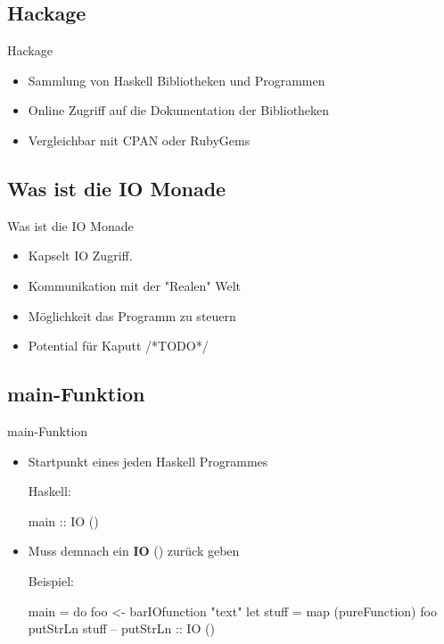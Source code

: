 \documentclass{beamer}
\begin{document}
\subsection{Hackage}
\begin{frame}{Hackage}
\begin{itemize}
\item Sammlung von Haskell Bibliotheken und Programmen
\item Online Zugriff auf die Dokumentation der Bibliotheken
\item Vergleichbar mit CPAN oder RubyGems
\end{itemize}
\end{frame}

\subsection{Was ist die IO Monade}
\begin{frame}[<+->]{Was ist die IO Monade}
\begin{itemize}
\item Kapselt IO Zugriff.
\item Kommunikation mit der "Realen" Welt
\item M\"oglichkeit das Programm zu steuern
\item Potential f\"ur Kaputt /*TODO*/
\end{itemize}
\end{frame}

\subsection{main-Funktion}
\begin{frame}[<+->][fragile]{main-Funktion}
\begin{itemize}
\item Startpunkt eines jeden Haskell Programmes
\begin{block}{Haskell:}
\begin{haskell}
main :: IO ()
\end{haskell}
\end{block}
\item Muss demnach ein \textbf{IO} () zurück geben
\begin{block}{Beispiel:}
\begin{haskell}
main = do 
  foo <- barIOfunction "text"
  let stuff = map (pureFunction) foo
  putStrLn stuff -- putStrLn :: IO ()
\end{haskell}
\end{block}
\end{itemize}
\end{frame}
\end{document}
